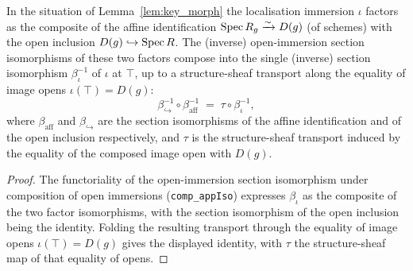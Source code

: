 \begin{lemma}\leanok
  \label{lem:tile_appIso_comp}
  In the situation of Lemma~\ref{lem:key_morph} the localisation immersion \(\iota\) factors as the
  composite of the affine identification \(\operatorname{Spec} R_g \xrightarrow{\sim} D(g)\) (of schemes) with the open
  inclusion \(D(g) \hookrightarrow \operatorname{Spec} R\). The (inverse) open-immersion section isomorphisms of these
  two factors compose into the single (inverse) section isomorphism \(\beta_\iota^{-1}\) of \(\iota\) at
  \(\top\), up to a structure-sheaf transport along the equality of image opens
  \(\iota(\top) = D(g)\):
  \[
    \beta_{\hookrightarrow}^{-1} \circ \beta_{\mathrm{aff}}^{-1}
    \;=\;
    \tau \circ \beta_\iota^{-1},
  \]
  where \(\beta_{\mathrm{aff}}\) and \(\beta_{\hookrightarrow}\) are the section isomorphisms of the
  affine identification and of the open inclusion respectively, and \(\tau\) is the structure-sheaf
  transport induced by the equality of the composed image open with \(D(g)\).
\end{lemma}
\begin{proof}

\leanok
  The functoriality of the open-immersion section isomorphism under composition of open immersions
  (\texttt{comp\_appIso}) expresses \(\beta_\iota\) as the composite of the two factor isomorphisms, with
  the section isomorphism of the open inclusion being the identity. Folding the resulting transport
  through the equality of image opens \(\iota(\top) = D(g)\) gives the displayed identity, with \(\tau\)
  the structure-sheaf map of that equality of opens.
\end{proof}


